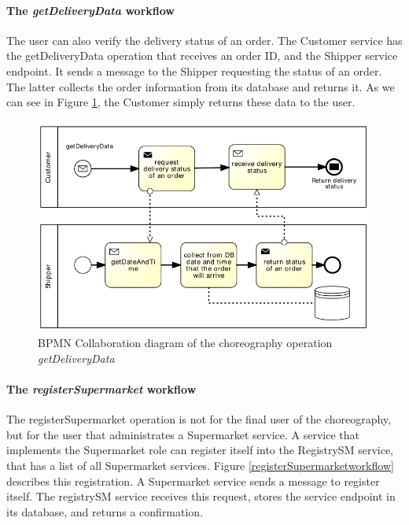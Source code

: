 \paragraph{The \emph{getDeliveryData} workflow\\}
The user can also verify the delivery status of an order. The Customer service has the getDeliveryData operation that receives an order ID, and the Shipper service endpoint. It sends a message to the Shipper requesting the status of an order. The latter collects the order information  from its database and returns it. As we can see in Figure \ref{getDeliveryDataworkflow}, the Customer simply returns these data to the user.

\begin{figure}[htbp]
\begin{center}
	\includegraphics{images/getDeliveryDataworkflow}
\caption{BPMN Collaboration diagram of the choreography operation \emph{getDeliveryData}}
\label{getDeliveryDataworkflow}
\end{center}
\end{figure}

\paragraph{The \emph{registerSupermarket} workflow\\}
The registerSupermarket operation is not for the final user of the choreography, but for the user that administrates a Supermarket service. A service that implements the Supermarket role can register itself into the RegistrySM service, that has a list of all Supermarket services. Figure \ref{registerSupermarketworkflow} describes this registration. A Supermarket service sends a message to register itself. The registrySM service receives this request, stores the service endpoint in its database, and returns a confirmation.

